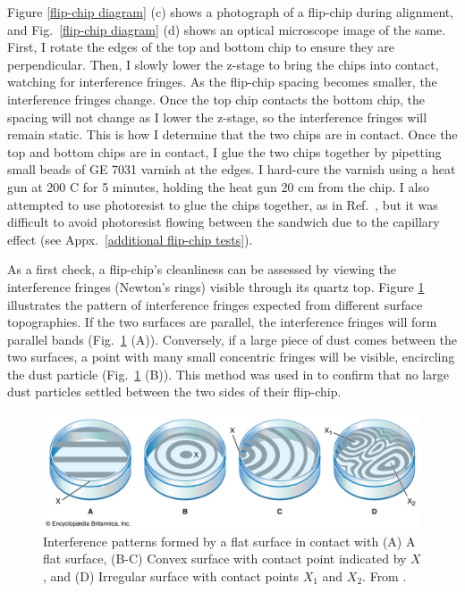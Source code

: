 \documentclass{beavtex_dub_edit}
\begin{document}
Figure \ref{flip-chip diagram} (c) shows a photograph of a flip-chip during alignment, and Fig.\ \ref{flip-chip diagram} (d) shows an optical microscope image of the same. First, I rotate the edges of the top and bottom chip to ensure they are perpendicular. Then, I slowly lower the z-stage to bring the chips into contact, watching for interference fringes. As the flip-chip spacing becomes smaller, the interference fringes change. Once the top chip contacts the bottom chip, the spacing will not change as I lower the z-stage, so the interference fringes will remain static. This is how I determine that the two chips are in contact. Once the top and bottom chips are in contact, I glue the two chips together by pipetting small beads of GE 7031 varnish at the edges. I hard-cure the varnish using a heat gun at 200 C for 5 minutes, holding the heat gun 20 cm from the chip. I also attempted to use photoresist to glue the chips together, as in Ref.\ \cite{beukman_noninvasive_2015}, but it was difficult to avoid photoresist flowing between the sandwich due to the capillary effect (see Appx.\ \ref{additional flip-chip tests}).

As a first check, a flip-chip's cleanliness can be assessed by viewing the interference fringes (Newton's rings) visible through its quartz top. Figure \ref{newtonsrings} illustrates the pattern of interference fringes expected from different surface topographies. If the two surfaces are parallel, the interference fringes will form parallel bands (Fig.\ \ref{newtonsrings} (A)). Conversely, if a large piece of dust comes between the two surfaces, a point with many small concentric fringes will be visible, encircling the dust particle (Fig.\ \ref{newtonsrings} (B)). This method was used in \cite{bennaceur_mechanical_2015} to confirm that no large dust particles settled between the two sides of their flip-chip.

\begin{figure}
    \includegraphics[width=1\textwidth]{newtonsrings.png}
    \caption{Interference patterns formed by a flat surface in contact with (A) A flat surface, (B-C) Convex surface with contact point indicated by $X$, and (D) Irregular surface with contact points $X_1$ and $X_2$.  From \cite{noauthor_newtons_nodate}.}
    \label{newtonsrings}
\end{figure}
\end{document}
